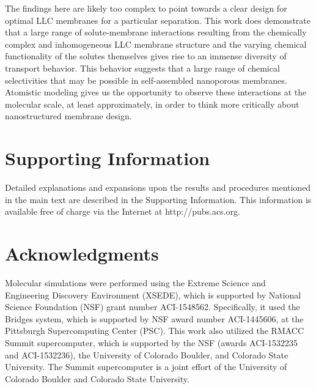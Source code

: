 \documentclass[journal=jpcbfk,manuscript=article]{achemso}
\begin{document}
  The findings here are likely too complex to point towards a clear design for optimal LLC membranes for a 
  particular separation.   
  This work does demonstrate that a large range of solute-membrane interactions
  resulting from the chemically complex and inhomogeneous LLC membrane structure
  and the varying chemical functionality of the solutes themselves 
  gives rise to an immense diversity of transport behavior. This behavior suggests 
  that a large range of chemical selectivities that may be 
  possible in self-assembled nanoporous membranes. 
  Atomistic modeling gives
  us the opportunity to observe these interactions at the molecular scale, at least approximately,
  in order to think more critically about nanostructured membrane design. 

  \section*{Supporting Information}

  Detailed explanations and expansions upon the results and procedures mentioned in
  the main text are described in the Supporting Information. This information is
  available free of charge via the Internet at http://pubs.acs.org.

  \section*{Acknowledgments}

  Molecular simulations were performed using the Extreme Science and
  Engineering Discovery Environment (XSEDE), which is supported by National
  Science Foundation (NSF) grant number ACI-1548562. Specifically, it used the Bridges
  system, which is supported by NSF award number ACI-1445606, at the Pittsburgh
  Supercomputing Center (PSC). This work also utilized the RMACC Summit supercomputer,
  which is supported by the NSF (awards ACI-1532235 and
  ACI-1532236), the University of Colorado Boulder, and Colorado State
  University. The Summit supercomputer is a joint effort of the University of
  Colorado Boulder and Colorado State University.
  
\end{document}
